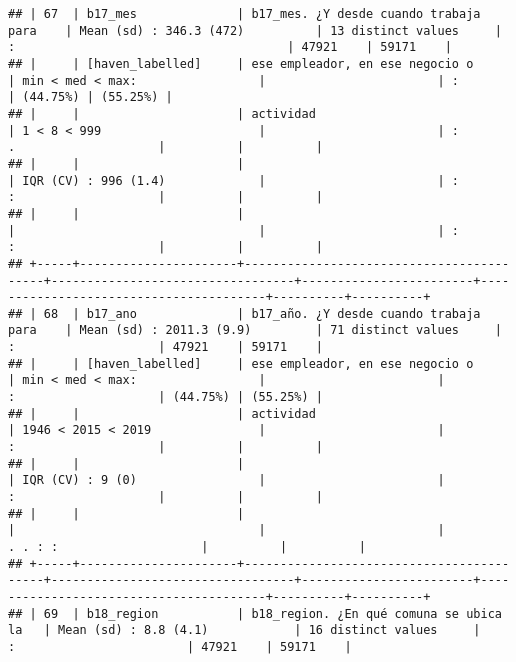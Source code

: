 \documentclass[]{article}
\begin{document}
\begin{verbatim}
## | 67  | b17_mes              | b17_mes. ¿Y desde cuando trabaja para    | Mean (sd) : 346.3 (472)          | 13 distinct values     | :                                      | 47921    | 59171    |
## |     | [haven_labelled]     | ese empleador, en ese negocio o          | min < med < max:                 |                        | :                                      | (44.75%) | (55.25%) |
## |     |                      | actividad                                | 1 < 8 < 999                      |                        | :                 .                    |          |          |
## |     |                      |                                          | IQR (CV) : 996 (1.4)             |                        | :                 :                    |          |          |
## |     |                      |                                          |                                  |                        | :                 :                    |          |          |
## +-----+----------------------+------------------------------------------+----------------------------------+------------------------+----------------------------------------+----------+----------+
## | 68  | b17_ano              | b17_año. ¿Y desde cuando trabaja para    | Mean (sd) : 2011.3 (9.9)         | 71 distinct values     |                   :                    | 47921    | 59171    |
## |     | [haven_labelled]     | ese empleador, en ese negocio o          | min < med < max:                 |                        |                   :                    | (44.75%) | (55.25%) |
## |     |                      | actividad                                | 1946 < 2015 < 2019               |                        |                   :                    |          |          |
## |     |                      |                                          | IQR (CV) : 9 (0)                 |                        |                   :                    |          |          |
## |     |                      |                                          |                                  |                        |             . . : :                    |          |          |
## +-----+----------------------+------------------------------------------+----------------------------------+------------------------+----------------------------------------+----------+----------+
## | 69  | b18_region           | b18_region. ¿En qué comuna se ubica la   | Mean (sd) : 8.8 (4.1)            | 16 distinct values     |               :                        | 47921    | 59171    |

\end{verbatim}
\end{document}
